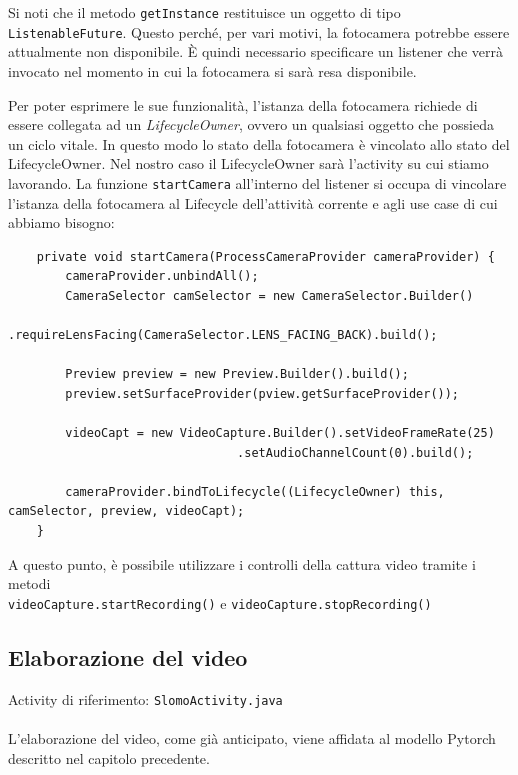 Si noti che il metodo \texttt{getInstance} restituisce un oggetto di tipo \texttt{ListenableFuture}. Questo perché, per vari
motivi, la fotocamera potrebbe essere attualmente non disponibile. 
È quindi necessario specificare un listener che verrà invocato nel momento in cui la fotocamera si sarà resa disponibile.

Per poter esprimere le sue funzionalità, l'istanza della fotocamera richiede di essere collegata ad un 
\textit{LifecycleOwner}, ovvero un qualsiasi oggetto che possieda un ciclo vitale. In questo modo lo stato della fotocamera 
è vincolato allo stato del LifecycleOwner. Nel nostro caso il LifecycleOwner sarà l'activity su cui stiamo lavorando. 
La funzione \texttt{startCamera} all'interno del listener si occupa di vincolare l'istanza della fotocamera al Lifecycle
dell'attività corrente e agli use case di cui abbiamo bisogno:

\begin{lstlisting}
    private void startCamera(ProcessCameraProvider cameraProvider) {
        cameraProvider.unbindAll();
        CameraSelector camSelector = new CameraSelector.Builder()
                .requireLensFacing(CameraSelector.LENS_FACING_BACK).build();

        Preview preview = new Preview.Builder().build();
        preview.setSurfaceProvider(pview.getSurfaceProvider());

        videoCapt = new VideoCapture.Builder().setVideoFrameRate(25)
                                .setAudioChannelCount(0).build();

        cameraProvider.bindToLifecycle((LifecycleOwner) this, camSelector, preview, videoCapt);
    }
\end{lstlisting}

A questo punto, è possibile utilizzare i controlli della cattura video tramite i metodi \\
\texttt{videoCapture.startRecording()} e \texttt{videoCapture.stopRecording()}

\subsection*{Elaborazione del video}

Activity di riferimento: \texttt{SlomoActivity.java} \\ \\
L'elaborazione del video, come già anticipato, viene affidata al modello Pytorch descritto nel capitolo precedente.

